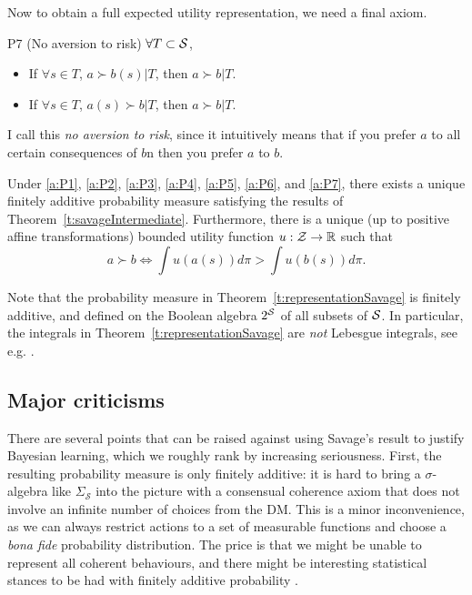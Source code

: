 Now to obtain a full expected utility representation, we need a final axiom.
\begin{axiom}{P7 (No aversion to risk)}\label{a:P7}
$\forall T\subset\mathcal{S}$,
\begin{itemize}
\item If $\forall s\in T$, $a\succ b(s)\vert T$, then $a\succ b\vert T$.
\item If $\forall s\in T$, $a(s)\succ b\vert T$, then $a\succ b\vert T$.
\end{itemize}
\end{axiom}
I call this \emph{no aversion to risk}, since it intuitively means that if you prefer $a$ to all certain consequences of $b$n then you prefer $a$ to $b$. 
\begin{theorem}
Under \ref{a:P1}, \ref{a:P2}, \ref{a:P3}, \ref{a:P4}, \ref{a:P5}, \ref{a:P6}, and \ref{a:P7}, there exists a unique finitely additive probability measure satisfying the results of Theorem~\ref{t:savageIntermediate}. Furthermore, there is a unique (up to positive affine transformations) bounded utility function $u:\mathcal{Z}\rightarrow \mathbb{R}$ such that
$$ a\succ b \Leftrightarrow \int u(a(s))d\pi > \int u(b(s))d\pi.$$
\label{t:representationSavage}
\end{theorem}
Note that the probability measure in Theorem~\ref{t:representationSavage} is finitely additive, and defined on the Boolean algebra $2^{\mathcal{S}}$ of all subsets of $\mathcal{S}$. In particular, the integrals in Theorem~\ref{t:representationSavage} are \emph{not} Lebesgue integrals, see e.g. \cite{Kre88}.

\subsection{Major criticisms}
There are several points that can be raised against using Savage's result to justify Bayesian learning, which we roughly rank by increasing seriousness. 
First, the resulting probability measure is only finitely additive: it is hard to bring a $\sigma$-algebra like $\Sigma_\mathcal{S}$ into the picture with a consensual coherence axiom that does not involve an infinite number of choices from the DM. 
This is a minor inconvenience, as we can always restrict actions to a set of measurable functions and choose a \emph{bona fide} probability distribution.
The price is that we might be unable to represent all coherent behaviours, and there might be interesting statistical stances to be had with finitely additive probability \citep{}.

